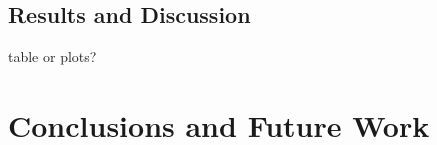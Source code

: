 \documentclass{llncs}
\begin{document}
\subsection{Results and Discussion}
\label{sec-results}

table or plots?



\section{Conclusions and Future Work}
\label{sec-concl}



 
\end{document}
